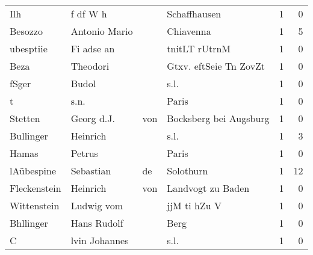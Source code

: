 \begin{center}
\begin{tiny}
\begin{longtabu}{llllrr}
                      Ilh &                           f df W h &             &                                Schaffhausen &          1 &         0 \\
                  Besozzo &                      Antonio Mario &             &                                   Chiavenna &          1 &         5 \\
                ubesptiie &                         Fi adse an &             &                               tnitLT rUtrnM &          1 &         0 \\
                     Beza &                           Theodori &             &                      Gtxv. eftSeie Tn ZovZt &          1 &         0 \\
                    fSger &                              Budol &             &                                        s.l. &          1 &         0 \\
                        t &                               s.n. &             &                                       Paris &          1 &         0 \\
                  Stetten &                         Georg d.J. &         von &                      Bocksberg bei Augsburg &          1 &         0 \\
                Bullinger &                           Heinrich &             &                                        s.l. &          1 &         3 \\
                    Hamas &                             Petrus &             &                                       Paris &          1 &         0 \\
               lAübespine &                          Sebastian &          de &                                   Solothurn &          1 &        12 \\
             Fleckenstein &                           Heinrich &         von &                           Landvogt zu Baden &          1 &         0 \\
              Wittenstein &                         Ludwig vom &             &                                jjM ti hZu V &          1 &         0 \\
                Bhllinger &                        Hans Rudolf &             &                                        Berg &          1 &         0 \\
                        C &                      lvin Johannes &             &                                        s.l. &          1 &         0 \\

\end{longtabu}
\end{tiny}
\end{center}
